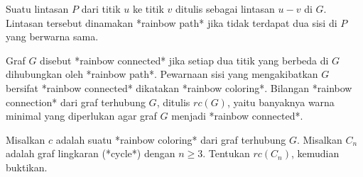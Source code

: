 Suatu lintasan $P$ dari titik $u$ ke titik $v$ ditulis sebagai lintasan $u-v$ di $G$. Lintasan tersebut dinamakan *rainbow path* jika tidak terdapat dua sisi di $P$ yang berwarna sama.

Graf $G$ disebut *rainbow connected* jika setiap dua titik yang berbeda di $G$ dihubungkan oleh *rainbow path*. Pewarnaan sisi yang mengakibatkan $G$ bersifat *rainbow connected* dikatakan *rainbow coloring*. Bilangan *rainbow connection* dari graf terhubung $G$, ditulis $rc(G)$, yaitu banyaknya warna minimal yang diperlukan agar graf $G$ menjadi *rainbow connected*.

Misalkan $c$ adalah suatu *rainbow coloring* dari graf terhubung $G$. Misalkan $C_n$ adalah graf lingkaran (*cycle*) dengan $n\ge3$. Tentukan $rc(C_n)$, kemudian buktikan.